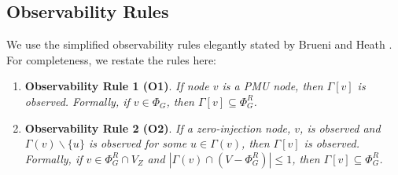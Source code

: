 \begin{comment}
\begin{table}[t]
\begin{center}
\begin{tabular}{l l} 
\hline \hline
   	{\bf Notation} & {\bf Meaning} \\
		  \hline 
		  	$G$ &  undirected graph $(V,E)$ where each $v \in V$ is a bus and each \\
				&  $(u,v) \in E$ is a transmission line connecting $u$ and $v$\\
			$\Gamma(v)$ & $\{u \in V$ $|$ $(u,v) \in E \}$ \\ 
			$\Gamma[v]$ & $\Gamma(v) \cup \{v\}$ \\
 		 	$n$ & $|V|$ \\
			$\Phi$ & a subset of $V$ in which PMUs are placed such that all \\ 
				   & $v \in V$ and all $(u,v) \in E$ observed  \\
			$\Phi^R$ & set of observed nodes \\
			$\Phi^-$ & set of observed edges \\
			\hline \hline
	\end{tabular}
	\end{center}
\caption{Notation Table}
\label{tab:notation}
\end{table}
\end{comment}

\subsection{Observability Rules}
\label{subsec:observe}

We use the simplified observability rules elegantly stated by Brueni and Heath \cite{Brueni05}. For completeness, we restate the rules here:
\begin{enumerate}
	
	\item {\bf Observability Rule 1 (O1)}.  {\it If node $v$ is a PMU node, then $\Gamma[v]$ is observed. Formally, if $v \in \Phi_G$, then $\Gamma[v] \subseteq \Phi^R_G$. }

	\item {\bf Observability Rule 2 (O2)}. {\it If a zero-injection node, $v$, is observed and  $\Gamma(v)\backslash\{u\}$ is observed for some $u\in\Gamma(v)$, then  $\Gamma[v]$ is observed.
	Formally, if $v \in \Phi^R_G \cap V_Z$ and $|\Gamma(v) \cap (V - \Phi^R_G)| \leq 1$, then $\Gamma[v] \subseteq \Phi^R_G$. }

\end{enumerate}

